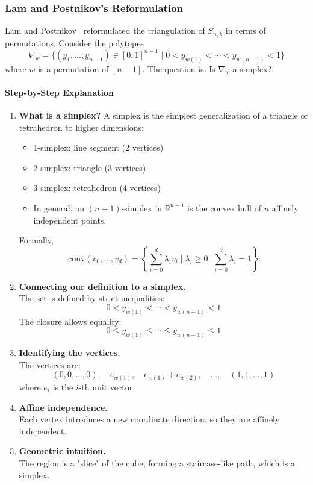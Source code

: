 \documentclass[12pt]{article}
\theoremstyle{definition}
\numberwithin{equation}{subsection}
\begin{document}
\subsubsection{Lam and Postnikov's Reformulation}

Lam and Postnikov~\cite{LP07} reformulated the triangulation of $S_{n,k}$ in terms of permutations. Consider the polytopes 
\[
\nabla_w = \{(y_1,\dots,y_{n-1})\in [0,1]^{n-1} \mid 0 < y_{w(1)} < \cdots < y_{w(n-1)} < 1\}
\]
where $w$ is a permutation of $[n-1]$. The question is: Is $\nabla_w$ a simplex?

\paragraph{Step-by-Step Explanation}
\begin{enumerate}
    \item \textbf{What is a simplex?} 
    A simplex is the simplest generalization of a triangle or tetrahedron to higher dimensions:
    \begin{itemize}
        \item 1-simplex: line segment (2 vertices)
        \item 2-simplex: triangle (3 vertices)
        \item 3-simplex: tetrahedron (4 vertices)
        \item In general, an $(n-1)$-simplex in $\mathbb{R}^{n-1}$ is the convex hull of $n$ affinely independent points.
    \end{itemize}
    Formally,
    \[
    \text{conv}(v_0, \ldots, v_d) = \left\{ \sum_{i=0}^d \lambda_i v_i \mid \lambda_i \ge 0,\, \sum_{i=0}^d \lambda_i = 1 \right\}
    \]
    \item \textbf{Connecting our definition to a simplex.} \\
    The set is defined by strict inequalities:
    \[
    0 < y_{w(1)} < \cdots < y_{w(n-1)} < 1
    \]
    The closure allows equality:
    \[
    0 \leq y_{w(1)} \leq \cdots \leq y_{w(n-1)} \leq 1
    \]
    \item \textbf{Identifying the vertices.} \\
    The vertices are:
    \[
    (0,0,\dots,0),\quad e_{w(1)},\quad e_{w(1)}+e_{w(2)},\quad \dots,\quad (1,1,\dots,1)
    \]
    where $e_i$ is the $i$-th unit vector.
    \item \textbf{Affine independence.} \\
    Each vertex introduces a new coordinate direction, so they are affinely independent.
    \item \textbf{Geometric intuition.} \\
    The region is a "slice" of the cube, forming a staircase-like path, which is a simplex.
\end{enumerate}
\end{document}
